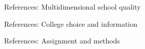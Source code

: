 \documentclass[11pt,aspectratio=169]{beamer}
\begin{document}
\begin{frame}{References: Multidimensional school quality}
\printbibliography[heading=none,category=schoolquality]
\end{frame}

\begin{frame}{References: College choice and information}
\printbibliography[heading=none,category=collegechoice]
\end{frame}

\begin{frame}{References: Assignment and methods}
\printbibliography[heading=none,category=assignmentmethods]
\end{frame}
\end{document}
